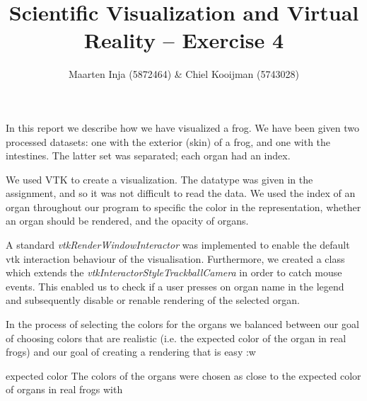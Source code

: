 \documentclass{article}[10pt]
\title{Scientific Visualization and Virtual Reality – Exercise 4}
\author{Maarten Inja (5872464) \& Chiel Kooijman (5743028)}
\begin{document}
\maketitle

In this report we describe how we have visualized a frog. We have been given two
processed datasets: one with the exterior (skin) of a frog, and one with the
intestines. The latter set was separated; each organ had an index.

We used VTK to create a visualization. The datatype was given in the
assignment, and so it was not difficult to read the data. We used the index of an
organ throughout our program to specific the color in the representation,
whether an organ should be rendered, and the opacity of organs.

A standard \emph{vtkRenderWindowInteractor} was implemented to enable the default
vtk interaction behaviour of the visualisation. Furthermore, we created a class
which extends the \emph{vtkInteractorStyleTrackballCamera} in order to catch
mouse events. This enabled us to check if a user presses on organ name in the
legend and subsequently disable or renable rendering of the selected organ.

In the process of selecting the colors for the organs we balanced between our
goal of choosing colors that are realistic (i.e. the expected color of the organ
in real frogs) and our goal of creating a rendering that is easy :w

expected color
The colors of the organs were chosen as close to the expected color of organs in
real frogs with
\end{document}
